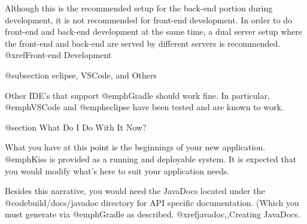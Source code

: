 Although this is the recommended setup for the back-end portion during
development, it is not recommended for front-end development.  In
order to do front-end and back-end development at the same time, a
dual server setup where the front-end and back-end are served by
different servers is recommended.  @xref{Front-end Development}



@subsection eclipse, VSCode, and Others

Other IDE's that support @emph{Gradle} should work fine.  In
particular, @emph{VSCode} and @emph{eclipse} have been tested and are
known to work.

@section What Do I Do With It Now?

What you have at this point is the beginnings of your new application.
@emph{Kiss} is provided as a running and deployable system.  It is
expected that you would modify what's here to suit your application
needs.

Besides this narrative, you would need the JavaDocs located under the
@code{build/docs/javadoc} directory for API specific documentation.
(Which you must generate via @emph{Gradle} as described. @xref{javadoc,,Creating JavaDocs}.
